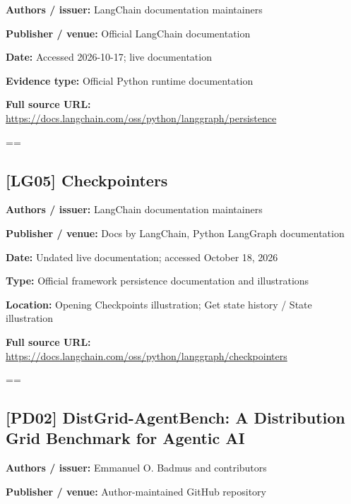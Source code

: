 \documentclass[10pt,letterpaper]{article}
\begin{document}
\textbf{Authors / issuer:} LangChain documentation maintainers\par
\textbf{Publisher / venue:} Official LangChain documentation\par
\textbf{Date:} Accessed 2026-10-17; live documentation\par
\textbf{Evidence type:} Official Python runtime documentation\par
\textbf{Full source URL:} \href{https://docs.langchain.com/oss/python/langgraph/persistence}{\small\ttfamily https:/\allowbreak{}/\allowbreak{}docs.\allowbreak{}langchain.\allowbreak{}com/\allowbreak{}oss/\allowbreak{}python/\allowbreak{}langgraph/\allowbreak{}persistence}\par
\egroup\par\noindent\box\readingEntry\par\medskip
\setbox\readingEntry=\vbox\bgroup\hsize=\linewidth\subsection*{[LG05] Checkpointers}
\textbf{Authors / issuer:} LangChain documentation maintainers\par
\textbf{Publisher / venue:} Docs by LangChain, Python LangGraph documentation\par
\textbf{Date:} Undated live documentation; accessed October 18, 2026\par
\textbf{Type:} Official framework persistence documentation and illustrations\par
\textbf{Location:} Opening Checkpoints illustration; Get state history / State illustration\par
\textbf{Full source URL:} \href{https://docs.langchain.com/oss/python/langgraph/checkpointers}{\small\ttfamily https:/\allowbreak{}/\allowbreak{}docs.\allowbreak{}langchain.\allowbreak{}com/\allowbreak{}oss/\allowbreak{}python/\allowbreak{}langgraph/\allowbreak{}checkpointers}\par
\egroup\par\noindent\box\readingEntry\par\medskip
\setbox\readingEntry=\vbox\bgroup\hsize=\linewidth\subsection*{[PD02] DistGrid-AgentBench: A Distribution Grid Benchmark for Agentic AI}
\textbf{Authors / issuer:} Emmanuel O. Badmus and contributors\par
\textbf{Publisher / venue:} Author-maintained GitHub repository\par
\end{document}
